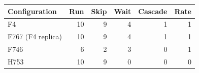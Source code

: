 \begin{tabular}{@{}lrrrrr@{}}\toprule
Configuration & Run & Skip & Wait & Cascade & Rate\\\midrule
F4 & 10 & 9 & 4 & 1 & 1\\
F767 (F4 replica) & 10 & 9 & 4 & 1 & 1\\
F746 & 6 & 2 & 3 & 0 & 1\\
H753 & 10 & 9 & 0 & 0 & 0\\
\bottomrule\end{tabular}
